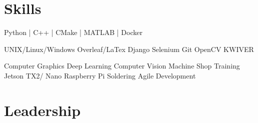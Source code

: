 \documentclass[]{deedy-resume-openfont}
\begin{document}
\begin{minipage}[t]{0.33\textwidth}

\section{Skills}
 \newline
Python | C++ | CMake | 
\newline MATLAB | Docker
\sectionsep

\newline
UNIX/Linux/Windows \newline
Overleaf/LaTex \newline
Django \newline
Selenium \newline
Git \newline
OpenCV \newline
KWIVER 
\sectionsep

 \newline
Computer Graphics \newline
Deep Learning \newline
Computer Vision \newline
Machine Shop Training \newline
Jetson TX2/ Nano \newline
Raspberry Pi \newline
Soldering \newline
Agile Development
\sectionsep

\section{Leadership}
\descript{}
\descript{}
\descript{}
\descript{}
\descript{}
\descript{}
\descript{}
\descript{}




%
%

\end{minipage} 
\end{document}
